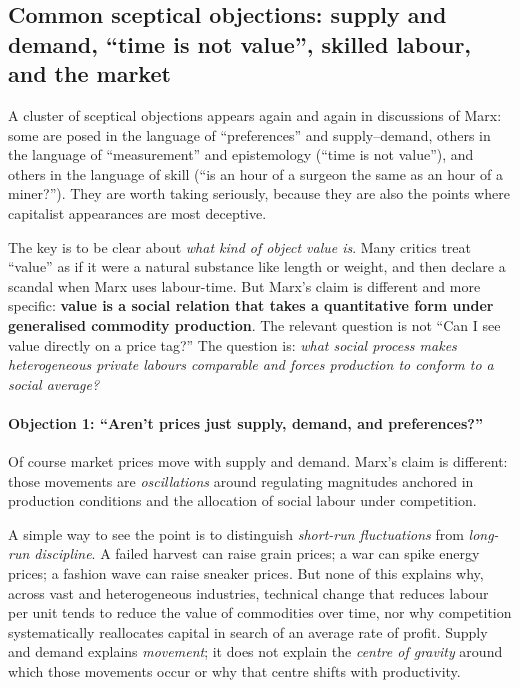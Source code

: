 \subsection{Common sceptical objections: supply and demand, ``time is not value'', skilled labour, and the market}
\label{sec:objections-measuring-value}

A cluster of sceptical objections appears again and again in discussions of Marx: some are posed in the language
of ``preferences'' and supply--demand, others in the language of ``measurement'' and epistemology (``time is not
value''), and others in the language of skill (``is an hour of a surgeon the same as an hour of a miner?'').
They are worth taking seriously, because they are also the points where capitalist appearances are most deceptive.

The key is to be clear about \emph{what kind of object value is}. Many critics treat ``value'' as if it were a
natural substance like length or weight, and then declare a scandal when Marx uses labour-time. But Marx’s claim
is different and more specific: \textbf{value is a social relation that takes a quantitative form under generalised
commodity production}. The relevant question is not ``Can I see value directly on a price tag?'' The question is:
\emph{what social process makes heterogeneous private labours comparable and forces production to conform to a social
average?}

\paragraph{Objection 1: ``Aren’t prices just supply, demand, and preferences?''}
Of course market prices move with supply and demand. Marx’s claim is different: those movements are \emph{oscillations}
around regulating magnitudes anchored in production conditions and the allocation of social labour under competition.\cite{Marx1867,Shaikh2016}

A simple way to see the point is to distinguish \emph{short-run fluctuations} from \emph{long-run discipline}. A failed
harvest can raise grain prices; a war can spike energy prices; a fashion wave can raise sneaker prices. But none of this
explains why, across vast and heterogeneous industries, technical change that reduces labour per unit tends to reduce the
value of commodities over time, nor why competition systematically reallocates capital in search of an average rate of profit.\cite{Marx1867,Shaikh2016}
Supply and demand explains \emph{movement}; it does not explain the \emph{centre of gravity} around which those movements occur
or why that centre shifts with productivity.

